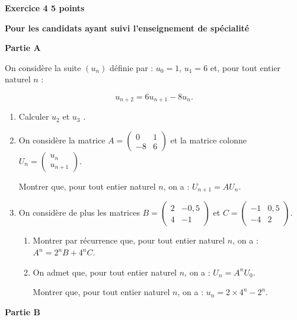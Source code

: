 \documentclass[10pt,a4paper]{article}
\begin{document}
\vspace{0,5cm}

\textbf{Exercice 4 \hfill 5 points}

\textbf{Pour les candidats ayant suivi l'enseignement de spécialité}

\bigskip
\begin{center}
\textbf{Partie A}
\end{center}

\smallskip

On considère la suite $\left(u_n\right)$ définie par : $u_0 = 1$,\: $u_1 = 6$ et, pour tout entier naturel $n$ :

\[u_{n+2} = 6u_{n+1} - 8u_n.\]

\begin{enumerate}
\item Calculer $u_2$ et $u_3$ .
\item On considère la matrice $A = \begin{pmatrix}0&1\\-8&6\end{pmatrix}$ et la matrice colonne $U_n = \begin{pmatrix}u_n\\u_{n+1}\end{pmatrix}$.

Montrer que, pour tout entier naturel $n$, on a : $U_{n+1} = AU_n$.
\item On considère de plus les matrices $B = \begin{pmatrix}2&-0,5\\4&- 1\end{pmatrix}$ et $C = \begin{pmatrix}- 1&0,5\\- 4&2\end{pmatrix}$.
	\begin{enumerate}
		\item Montrer par récurrence que, pour tout entier naturel $n$, on a : $A^n = 2^nB + 4^nC$.
		\item On admet que, pour tout entier naturel $n$, on a : $U_n = A^nU_0$.
		
Montrer que, pour tout entier naturel $n$, on a : $u_n = 2 \times 4^n - 2^n$.
 	\end{enumerate}
\end{enumerate}

\begin{center}
\textbf{Partie B}
\end{center}
\end{document}
